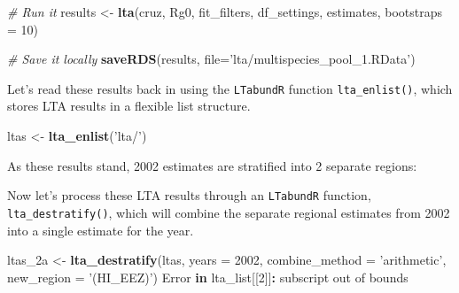 \documentclass[
]{book}
\newenvironment{Shaded}{\begin{snugshade}}{\end{snugshade}}
\newcommand{\CommentTok}[1]{\textcolor[rgb]{0.56,0.35,0.01}{\textit{#1}}}
\newcommand{\ControlFlowTok}[1]{\textcolor[rgb]{0.13,0.29,0.53}{\textbf{#1}}}
\newcommand{\DataTypeTok}[1]{\textcolor[rgb]{0.13,0.29,0.53}{#1}}
\newcommand{\DecValTok}[1]{\textcolor[rgb]{0.00,0.00,0.81}{#1}}
\newcommand{\KeywordTok}[1]{\textcolor[rgb]{0.13,0.29,0.53}{\textbf{#1}}}
\newcommand{\NormalTok}[1]{#1}
\newcommand{\OperatorTok}[1]{\textcolor[rgb]{0.81,0.36,0.00}{\textbf{#1}}}
\newcommand{\OtherTok}[1]{\textcolor[rgb]{0.56,0.35,0.01}{#1}}
\newcommand{\StringTok}[1]{\textcolor[rgb]{0.31,0.60,0.02}{#1}}
\begin{document}
\begin{Shaded}
\begin{Highlighting}[]
\CommentTok{# Run it}
\NormalTok{results <-}\StringTok{ }\KeywordTok{lta}\NormalTok{(cruz, Rg0, }
\NormalTok{               fit_filters, df_settings, estimates, }
               \DataTypeTok{bootstraps =} \DecValTok{10}\NormalTok{)}

\CommentTok{# Save it locally}
\KeywordTok{saveRDS}\NormalTok{(results, }\DataTypeTok{file=}\StringTok{'lta/multispecies_pool_1.RData'}\NormalTok{)}
\end{Highlighting}
\end{Shaded}

Let's read these results back in using the \texttt{LTabundR} function \texttt{lta\_enlist()}, which stores LTA results in a flexible list structure.

\begin{Shaded}
\begin{Highlighting}[]
\NormalTok{ltas <-}\StringTok{ }\KeywordTok{lta_enlist}\NormalTok{(}\StringTok{'lta/'}\NormalTok{)}
\end{Highlighting}
\end{Shaded}

As these results stand, 2002 estimates are stratified into 2 separate regions:

\begin{Shaded}
\end{Shaded}

Now let's process these LTA results through an \texttt{LTabundR} function, \texttt{lta\_destratify()}, which will combine the separate regional estimates from 2002 into a single estimate for the year.

\begin{Shaded}
\begin{Highlighting}[]
\NormalTok{ltas_2a <-}
\StringTok{  }\KeywordTok{lta_destratify}\NormalTok{(ltas,}
               \DataTypeTok{years =} \DecValTok{2002}\NormalTok{,}
               \DataTypeTok{combine_method =} \StringTok{'arithmetic'}\NormalTok{,}
               \DataTypeTok{new_region =} \StringTok{'(HI_EEZ)'}\NormalTok{)}
\NormalTok{Error }\ControlFlowTok{in}\NormalTok{ lta_list[[}\DecValTok{2}\NormalTok{]]}\OperatorTok{:}\StringTok{ }\NormalTok{subscript out of bounds}
\end{Highlighting}
\end{Shaded}
\end{document}

